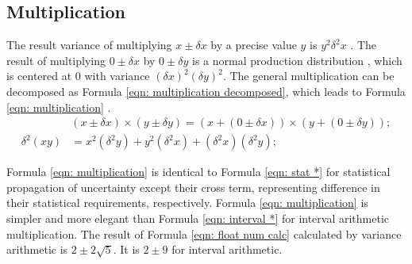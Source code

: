 \documentclass[twoside]{article}
\numberwithin{equation}{section}
\newcommand{\eqspace}{\;\;\;}
\begin{document}
\subsection{Multiplication}

The result variance of multiplying $x \pm \delta x$ by a precise value $y$ is $ y^2 \delta^2 x$ \cite{Probability_Statistics}.
The result of multiplying $0 \pm \delta x$ by $0 \pm \delta y$ is a normal production distribution \cite{Probability_Statistics}, which is centered at 0 with variance $(\delta x)^2 (\delta y)^2$.
The general multiplication can be decomposed as Formula \eqref{eqn: multiplication decomposed}, which leads to Formula \eqref{eqn: multiplication}  \cite{Prev_Precision_Arithmetic}.
\begin{align}
\label{eqn: multiplication decomposed}
& (x \pm \delta x) \times (y \pm \delta y) = (x + (0 \pm \delta x)) \times (y + (0 \pm \delta y)); \\
\label{eqn: multiplication}
\delta^2 (x y) &= x^2 (\delta^2 y) + y^2 (\delta^2 x) + (\delta^2 x)(\delta^2 y);
\end{align}

Formula \eqref{eqn: multiplication} is identical to Formula \eqref{eqn: stat *} for statistical propagation of uncertainty except their cross term, representing difference in their statistical requirements, respectively.  
Formula \eqref{eqn: multiplication} is simpler and more elegant than Formula \eqref{eqn: interval *} for interval arithmetic multiplication.  
The result of Formula \eqref{eqn: float num calc} calculated by variance arithmetic is $2 \pm 2\sqrt{5}$.
It is $2 \pm 9$ for interval arithmetic.
\end{document}
